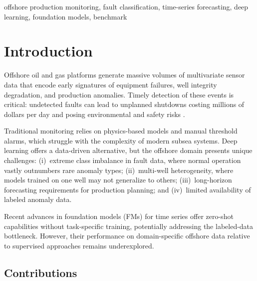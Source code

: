 \documentclass[conference]{IEEEtran}
\begin{document}
\begin{abstract}
longer horizons despite negative $R^2_\text{prod}$, highlighting the importance of multi-metric evaluation. Statistical significance is confirmed via Friedman tests on Ganymede (all horizons, $p < 0.05$) and Inner Mongolia ($h{=}7$ through $h{=}30$, $p < 0.05$); SPE BERG achieves significance at $h{=}7$ and $h{=}14$ only, with eleven model configurations in the 3W analysis ($\chi^2{=}43.5$, $p < 0.001$, Nemenyi CD${=}6.75$).
\end{abstract}

\begin{IEEEkeywords}
offshore production monitoring, fault classification, time-series forecasting, deep learning, foundation models, benchmark
\end{IEEEkeywords}

\section{Introduction}
\label{sec:intro}

Offshore oil and gas platforms generate massive volumes of multivariate sensor data that encode early signatures of equipment failures, well integrity degradation, and production anomalies. Timely detection of these events is critical: undetected faults can lead to unplanned shutdowns costing millions of dollars per day and posing environmental and safety risks \cite{3w}.

Traditional monitoring relies on physics-based models and manual threshold alarms, which struggle with the complexity of modern subsea systems. Deep learning offers a data-driven alternative, but the offshore domain presents unique challenges: (i)~extreme class imbalance in fault data, where normal operation vastly outnumbers rare anomaly types; (ii)~multi-well heterogeneity, where models trained on one well may not generalize to others; (iii)~long-horizon forecasting requirements for production planning; and (iv)~limited availability of labeled anomaly data.

Recent advances in foundation models (FMs) for time series \cite{chronos, timesfm, tirex} offer zero-shot capabilities without task-specific training, potentially addressing the labeled-data bottleneck. However, their performance on domain-specific offshore data relative to supervised approaches remains underexplored.

\subsection{Contributions}
\end{document}
